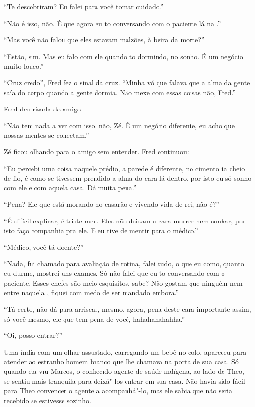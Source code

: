 ``Te descobriram? Eu falei para você tomar cuidado.''

``Não é isso, não. É que agora eu to conversando com o paciente lá na
.''

``Mas você não falou que eles estavam malzões, à beira da morte?''

``Estão, sim. Mas eu falo com ele quando to dormindo, no sonho. É um
negócio muito louco.''

``Cruz credo'', Fred fez o sinal da cruz. ``Minha vó que falava que a
alma da gente saía do corpo quando a gente dormia. Não mexe com essas
coisas não, Fred.''

Fred deu risada do amigo.

``Não tem nada a ver com isso, não, Zé. É um negócio diferente, eu acho
que nossas mentes se conectam.''

Zé ficou olhando para o amigo sem entender. Fred continuou:

``Eu percebi uma coisa naquele prédio, a parede é diferente, no cimento
ta cheio de fio, é como se tivessem prendido a alma do cara lá dentro,
por isto eu só sonho com ele e com aquela casa. Dá muita pena.''

``Pena? Ele que está morando no casarão e vivendo vida de rei, não é?''

``É difícil explicar, é triste meu. Eles não deixam o cara morrer nem
sonhar, por isto faço companhia pra ele. E eu tive de mentir para o
médico.''

``Médico, você tá doente?''

``Nada, fui chamado para avaliação de rotina, falei tudo, o que eu como,
quanto eu durmo, mostrei uns exames. Só não falei que eu to conversando
com o paciente. Esses chefes são meio esquisitos, sabe? Não gostam que
ninguém nem entre naquela , fiquei com medo de ser mandado embora.''

``Tá certo, não dá para arriscar, mesmo, agora, pena deste cara
importante assim, só você mesmo, ele que tem pena de você,
hahahahahahha.''

\asterisc


``Oi, posso entrar?''

Uma índia com um olhar assustado, carregando um bebê no colo, apareceu
para atender ao estranho homem branco que lhe chamava na porta de sua
casa. Só quando ela viu Marcos, o conhecido agente de saúde indígena, ao
lado de Theo, se sentiu mais tranquila para deixá"-los entrar em sua
casa. Não havia sido fácil para Theo convencer o agente a acompanhá"-lo,
mas ele sabia que não seria recebido se estivesse sozinho.

